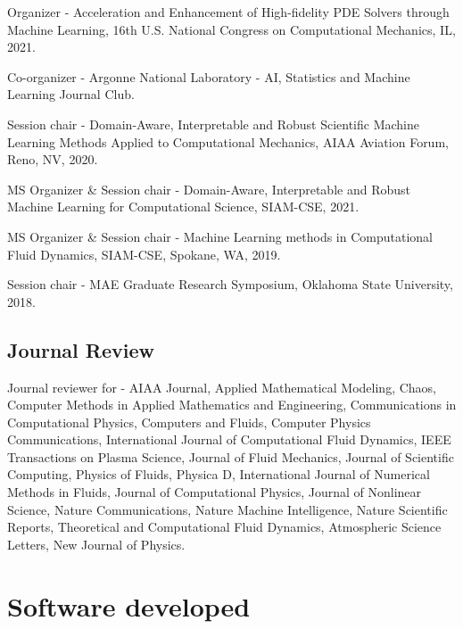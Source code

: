 \documentclass[letterpaper]{article}
\renewenvironment{itemize}{
  \begin{list}{}{
    \setlength{\leftmargin}{1.5em}
  }
}{
  \end{list}
}
\begin{document}
\begin{itemize}
  \item Organizer - Acceleration and Enhancement of High-fidelity PDE Solvers through Machine Learning, 16th U.S. National Congress on Computational Mechanics, IL, 2021.
  \item Co-organizer - Argonne National Laboratory - AI, Statistics and Machine Learning Journal Club.
  \item Session chair - Domain-Aware, Interpretable and Robust Scientific Machine Learning Methods Applied to Computational Mechanics, AIAA Aviation Forum, Reno, NV, 2020.
  \item MS Organizer \& Session chair - Domain-Aware, Interpretable and Robust Machine Learning for Computational Science, SIAM-CSE, 2021.
  \item MS Organizer \& Session chair - Machine Learning methods in Computational Fluid Dynamics, SIAM-CSE, Spokane, WA, 2019.
  \item Session chair - MAE Graduate Research Symposium, Oklahoma State University, 2018.
\end{itemize}

\subsection*{Journal Review}

\begin{itemize}
  \item Journal reviewer for - AIAA Journal, Applied Mathematical Modeling, Chaos, Computer Methods in Applied Mathematics and Engineering, Communications in Computational Physics, Computers and Fluids, Computer Physics Communications, International Journal of Computational Fluid Dynamics, IEEE Transactions on Plasma Science, Journal of Fluid Mechanics, Journal of Scientific Computing, Physics of Fluids, Physica D, International Journal of Numerical Methods in Fluids, Journal of Computational Physics, Journal of Nonlinear Science, Nature Communications, Nature Machine Intelligence, Nature Scientific Reports, Theoretical and Computational Fluid Dynamics, Atmospheric Science Letters, New Journal of Physics.
\end{itemize}

\section*{Software developed}
\end{document}
